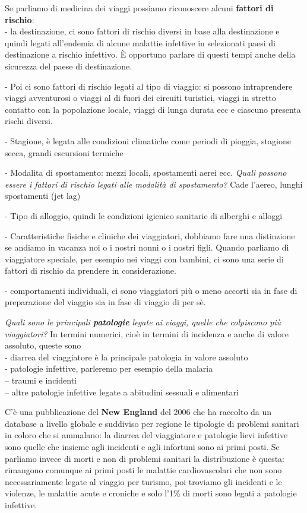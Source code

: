 \documentclass[]{article}
\begin{document}
Se parliamo di medicina dei viaggi possiamo riconoscere alcuni
\textbf{fattori di rischio}:\\
- la destinazione, ci sono fattori di rischio diversi in base alla
destinazione e quindi legati all'endemia di alcune malattie infettive in
selezionati paesi di destinazione a rischio infettivo. È opportuno
parlare di questi tempi anche della sicurezza del paese di destinazione.

- Poi ci sono fattori di rischio legati al tipo di viaggio: si possono
intraprendere viaggi avventurosi o viaggi al di fuori dei circuiti
turistici, viaggi in stretto contatto con la popolazione locale, viaggi
di lunga durata ecc e ciascuno presenta rischi diversi.

- Stagione, è legata alle condizioni climatiche come periodi di pioggia,
stagione secca, grandi escursioni termiche

- Modalita di spostamento: mezzi locali, spostamenti aerei ecc.
\emph{Quali possono essere i fattori di rischio legati alle modalità di
spostamento?} Cade l'aereo, lunghi spostamenti (jet lag)

- Tipo di alloggio, quindi le condizioni igienico sanitarie di alberghi
e alloggi

- Caratteristiche fisiche e cliniche dei viaggiatori, dobbiamo fare una
distinzione se andiamo in vacanza noi o i nostri nonni o i nostri figli.
Quando parliamo di viaggiatore speciale, per esempio nei viaggi con
bambini, ci sono una serie di fattori di rischio da prendere in
considerazione.

- comportamenti individuali, ci sono viaggiatori più o meno accorti sia
in fase di preparazione del viaggio sia in fase di viaggio di per sè.

\emph{Quali sono le principali \textbf{patologie} legate ai viaggi,
quelle che colpiscono più viaggiatori?} In termini numerici, cioè in
termini di incidenza e anche di valore assoluto, queste sono\\
- diarrea del viaggiatore è la principale patologia in valore assoluto\\
- patologie infettive, parleremo per esempio della malaria\\
-- traumi e incidenti\\
-- altre patologie infettive legate a abitudini sessuali e alimentari

C'è una pubblicazione del \textbf{New England} del 2006 che ha raccolto
da un database a livello globale e suddiviso per regione le tipologie di
problemi sanitari in coloro che si ammalano: la diarrea del viaggiatore
e patologie lievi infettive sono quelle che insieme agli incidenti e
agli infortuni sono ai primi posti. Se parliamo invece di morti e non di
problemi sanitari la distribuzione è questa: rimangono comunque ai primi
posti le malattie cardiovascolari che non sono necessariamente legate al
viaggio per turismo, poi troviamo gli incidenti e le violenze, le
malattie acute e croniche e solo l'1\% di morti sono legati a patologie
infettive.
\end{document}
